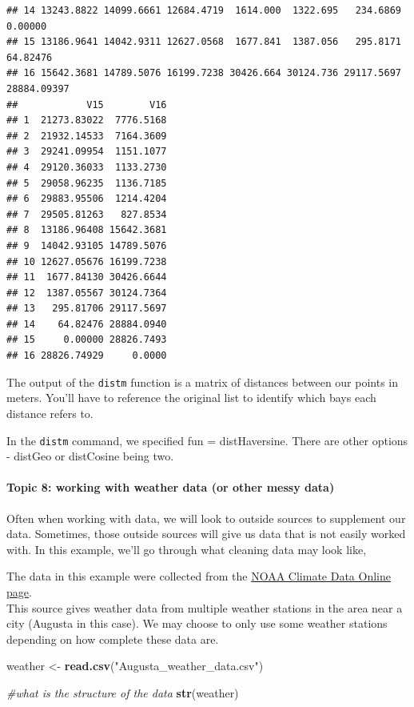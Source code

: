 \documentclass[
]{article}
\newenvironment{Shaded}{\begin{snugshade}}{\end{snugshade}}
\newcommand{\CommentTok}[1]{\textcolor[rgb]{0.56,0.35,0.01}{\textit{#1}}}
\newcommand{\FunctionTok}[1]{\textcolor[rgb]{0.13,0.29,0.53}{\textbf{#1}}}
\newcommand{\NormalTok}[1]{#1}
\newcommand{\OtherTok}[1]{\textcolor[rgb]{0.56,0.35,0.01}{#1}}
\newcommand{\StringTok}[1]{\textcolor[rgb]{0.31,0.60,0.02}{#1}}
\begin{document}
\begin{verbatim}
## 14 13243.8822 14099.6661 12684.4719  1614.000  1322.695   234.6869     0.00000
## 15 13186.9641 14042.9311 12627.0568  1677.841  1387.056   295.8171    64.82476
## 16 15642.3681 14789.5076 16199.7238 30426.664 30124.736 29117.5697 28884.09397
##            V15        V16
## 1  21273.83022  7776.5168
## 2  21932.14533  7164.3609
## 3  29241.09954  1151.1077
## 4  29120.36033  1133.2730
## 5  29058.96235  1136.7185
## 6  29883.95506  1214.4204
## 7  29505.81263   827.8534
## 8  13186.96408 15642.3681
## 9  14042.93105 14789.5076
## 10 12627.05676 16199.7238
## 11  1677.84130 30426.6644
## 12  1387.05567 30124.7364
## 13   295.81706 29117.5697
## 14    64.82476 28884.0940
## 15     0.00000 28826.7493
## 16 28826.74929     0.0000
\end{verbatim}

The output of the \texttt{distm} function is a matrix of distances
between our points in meters. You'll have to reference the original list
to identify which bays each distance refers to.

In the \texttt{distm} command, we specified fun = distHaversine. There
are other options - distGeo or distCosine being two.

\hypertarget{topic-8-working-with-weather-data-or-other-messy-data}{%
\paragraph{Topic 8: working with weather data (or other messy
data)}\label{topic-8-working-with-weather-data-or-other-messy-data}}

Often when working with data, we will look to outside sources to
supplement our data. Sometimes, those outside sources will give us data
that is not easily worked with. In this example, we'll go through what
cleaning data may look like,

The data in this example were collected from the
\href{https://www.ncei.noaa.gov/cdo-web/}{NOAA Climate Data Online
page}.\\
This source gives weather data from multiple weather stations in the
area near a city (Augusta in this case). We may choose to only use some
weather stations depending on how complete these data are.

\begin{Shaded}
\begin{Highlighting}[]
\NormalTok{weather }\OtherTok{\textless{}{-}} \FunctionTok{read.csv}\NormalTok{(}\StringTok{"Augusta\_weather\_data.csv"}\NormalTok{)}

\CommentTok{\#what is the structure of the data}
\FunctionTok{str}\NormalTok{(weather)}
\end{Highlighting}
\end{Shaded}
\end{document}
